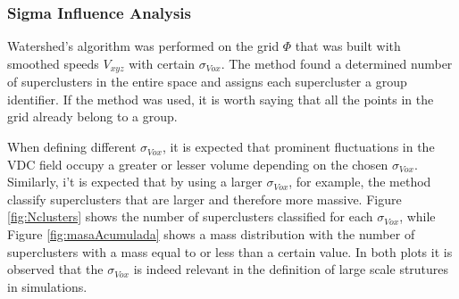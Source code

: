 \documentclass[a4paper,fleqn,usenatbib]{mnras}
\begin{document}
\subsubsection{Sigma Influence Analysis}
\label{sec:Sigmainfluence}
Watershed's algorithm was performed on the grid $\Phi$ that was built with smoothed speeds $V_{xyz}$ with certain  $\sigma_{Vox}$. The method found a determined number of superclusters in the entire space and assigns each supercluster a group identifier. If the method was used, it is worth saying that all the points in the grid already belong to a group.


When defining different $\sigma_{Vox}$, it is expected that prominent fluctuations in the VDC field occupy a greater or lesser volume depending on the chosen $\sigma_{Vox}$. Similarly, i't is expected that by using a larger $\sigma_{Vox}$, for example, the method classify superclusters that are larger and therefore more massive. Figure \ref{fig:Nclusters} shows the number of superclusters classified for each $\sigma_{Vox}$, while Figure \ref{fig:masaAcumulada}  shows a mass distribution with the number of superclusters with a mass equal to or less than a certain value. In both plots it is observed that the $\sigma_{Vox}$ is indeed relevant in the definition of large scale strutures in simulations.

\end{document}
